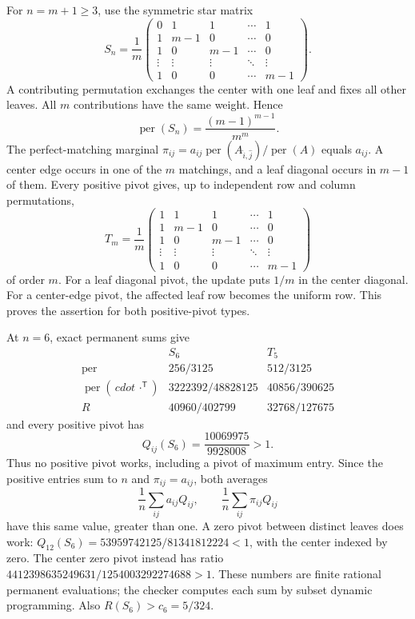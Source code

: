 \documentclass[11pt,a4paper]{article}
\theoremstyle{definition}
\theoremstyle{remark}
\newcommand{\per}{\operatorname{per}}
\newcommand{\T}{\mathsf{T}}
\begin{document}
For $n=m+1\ge3$, use the symmetric star matrix
\[
 S_n=\frac1m\begin{pmatrix}
 0&1&1&\cdots&1\\
 1&m-1&0&\cdots&0\\
 1&0&m-1&\cdots&0\\
 \vdots&\vdots&\vdots&\ddots&\vdots\\
 1&0&0&\cdots&m-1
 \end{pmatrix}.
\]
A contributing permutation exchanges the center with one leaf and fixes
all other leaves. All $m$ contributions have the same weight. Hence
\[
 \per(S_n)=\frac{(m-1)^{m-1}}{m^m}.
\]
The perfect-matching marginal
$\pi_{ij}=a_{ij}\per(A_{\widehat i,\widehat j})/\per(A)$ equals $a_{ij}$.
A center edge occurs in one of the $m$ matchings, and a leaf diagonal
occurs in $m-1$ of them.
Every positive pivot gives, up to independent row and column permutations,
\[
 T_m=\frac1m\begin{pmatrix}
 1&1&1&\cdots&1\\
 1&m-1&0&\cdots&0\\
 1&0&m-1&\cdots&0\\
 \vdots&\vdots&\vdots&\ddots&\vdots\\
 1&0&0&\cdots&m-1
 \end{pmatrix}
\]
of order $m$.
For a leaf diagonal pivot, the update puts $1/m$ in the center diagonal.
For a center-edge pivot, the affected leaf row becomes the uniform row.
This proves the assertion for both positive-pivot types.

At $n=6$, exact permanent sums give
\[
\begin{array}{c|cc}
 &S_6&T_5\\\hline
 \per&256/3125&512/3125\\
 \per(\,cdot\,\cdot^\T)&3222392/48828125&40856/390625\\
 R&40960/402799&32768/127675
\end{array}
\]
and every positive pivot has
\[
 Q_{ij}(S_6)=\frac{10069975}{9928008}>1.
\]
Thus no positive pivot works, including a pivot of maximum entry.
Since the positive entries sum to $n$ and $\pi_{ij}=a_{ij}$, both averages
\[
 \frac1n\sum_{ij}a_{ij}Q_{ij},\qquad
 \frac1n\sum_{ij}\pi_{ij}Q_{ij}
\]
have this same value, greater than one.
A zero pivot between distinct leaves does work:
$Q_{12}(S_6)=53959742125/81341812224<1$, with the center indexed by zero.
The center zero pivot instead has ratio
$4412398635249631/1254003292274688>1$.
These numbers are finite rational permanent evaluations; the checker
computes each sum by subset dynamic programming.
Also $R(S_6)>c_6=5/324$.
\end{document}
